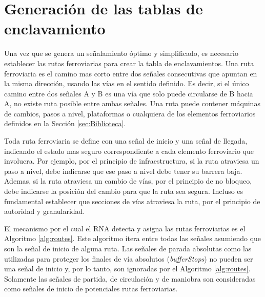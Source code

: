 \section{Generación de las tablas de enclavamiento}
	\label{sec:rutas}
	
	
	Una vez que se genera un señalamiento óptimo y simplificado, es necesario establecer las rutas ferroviarias para crear la tabla de enclavamientos. Una ruta ferroviaria es el camino mas corto entre dos señales consecutivas que apuntan en la misma dirección, usando las vías en el sentido definido. Es decir, si el único camino entre dos señales A y B es una vía que solo puede circularse de B hacia A, no existe ruta posible entre ambas señales. Una ruta puede contener máquinas de cambios, pasos a nivel, plataformas o cualquiera de los elementos ferroviarios definidos en la Sección \ref{sec:Biblioteca}.
	
	Toda ruta ferroviaria se define con una señal de inicio y una señal de llegada, indicando el estado mas seguro correspondiente a cada elemento ferroviario que involucra. Por ejemplo, por el principio de infraestructura, si la ruta atraviesa un paso a nivel, debe indicarse que ese paso a nivel debe tener su barrera baja. Ademas, si la ruta atraviesa un cambio de vías, por el principio de no bloqueo, debe indicarse la posición del cambio para que la ruta sea segura. Incluso es fundamental establecer que secciones de vías atraviesa la ruta, por el principio de autoridad y granularidad.
	
	El mecanismo por el cual el RNA detecta y asigna las rutas ferroviarias es el Algoritmo \ref{alg:routes}. Este algoritmo itera entre todas las señales asumiendo que son la señal de inicio de alguna ruta. Las señales de parada absolutas como las utilizadas para proteger los finales de vía absolutos (\textit{bufferStops}) no pueden ser una señal de inicio y, por lo tanto, son ignoradas por el Algoritmo \ref{alg:routes}. Solamente las señales de partida, de circulación y de maniobra son consideradas como señales de inicio de potenciales rutas ferroviarias.
	
